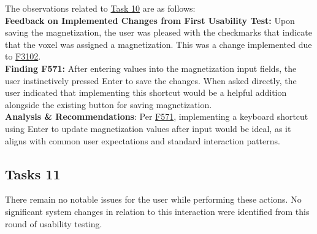 \documentclass{article}
\begin{document}
\noindent The observations related to \hyperlink{task:T10}{Task 10} are as follows:\\

\noindent \textbf{Feedback on Implemented Changes from First Usability Test:} Upon saving the magnetization, the user was pleased with the checkmarks that indicate that the voxel was assigned a magnetization. This was a change implemented due to \hyperlink{finding:F3102}{F3102}.\\

\noindent \hypertarget{finding:F571}{\textbf{Finding F571:}} 
After entering values into the magnetization input fields, the user instinctively pressed Enter to save the changes. When asked directly, the user indicated that implementing this shortcut would be a helpful addition alongside the existing button for saving magnetization. \\

\noindent \textbf{Analysis \& Recommendations}:
Per \hyperlink{finding:F571}{F571}, implementing a keyboard shortcut using Enter to update magnetization values after input would be ideal, as it aligns with common user expectations and standard interaction patterns.

\subsection{Tasks 11}

\noindent There remain no notable issues for the user while performing these actions. No significant system changes in relation to this interaction were identified from this round of usability testing.
  
\end{document}
